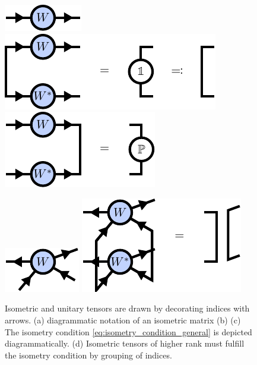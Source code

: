 \begin{figure}[h]
	\centering
	\begin{minipage}[b]{0.4\textwidth}
		\centering
		\subcaptionbox{\label{fig:basic_isometries_isometric_matrix}}
		{%
			\includegraphics[scale=1]{figures/tikz/Tensor_Networks/basic_isometries/basic_isometries_a.pdf}
		}
		\subcaptionbox{\label{fig:basic_isometries_isometric_matrix}}
		{%
			\includegraphics[scale=1]{figures/tikz/Tensor_Networks/basic_isometries/basic_isometries_b.pdf}
		}
		\subcaptionbox{\label{fig:basic_isometries_isometric_matrix}}
		{%
			\includegraphics[scale=1]{figures/tikz/Tensor_Networks/basic_isometries/basic_isometries_c.pdf}
		}
	\end{minipage}
	\quad\quad\quad
	\begin{minipage}[b]{0.4\textwidth}
		\centering
		\subcaptionbox{\label{fig:basic_isometries_isometric_matrix}}
		{%
			\includegraphics[scale=1]{figures/tikz/Tensor_Networks/basic_isometries/basic_isometries_d.pdf}
		}
		\subcaptionbox{\label{fig:basic_isometries_isometric_matrix}}
		{%
			\includegraphics[scale=1]{figures/tikz/Tensor_Networks/basic_isometries/basic_isometries_e.pdf}
		}
	\end{minipage}
	\caption{Isometric and unitary tensors are drawn by decorating indices with arrows. (a) diagrammatic notation of an isometric matrix (b) (c) The isometry condition \eqref{eq:isometry_condition_general} is depicted diagrammatically. (d) Isometric tensors of higher rank must fulfill the isometry condition by grouping of indices.}
	\label{fig:isometries_and_unitaries_diagrams}
\end{figure}

